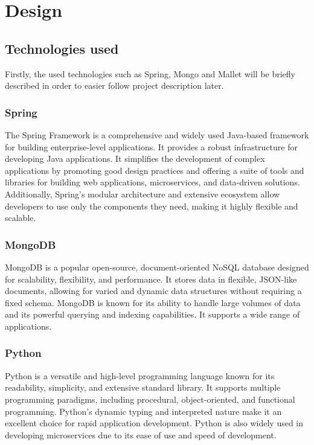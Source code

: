 \section{Design}

\label{ch:met}

\subsection{Technologies used}
Firstly, the used technologies such as Spring, Mongo and Mallet will be briefly described in order
to easier follow project description later.
\subsubsection{Spring}
The Spring Framework is a comprehensive and widely used Java-based framework for building
enterprise-level applications. It provides a robust infrastructure for developing Java applications.
It simplifies the development of complex applications by promoting good design practices and
offering a suite of tools and libraries for building web applications, microservices, and
data-driven solutions. Additionally, Spring's modular architecture and extensive ecosystem
allow developers to use only the components they need, making it highly flexible and scalable.
\cite{spring}

\subsubsection{MongoDB}
MongoDB is a popular open-source, document-oriented NoSQL database designed for scalability,
flexibility, and performance. It stores data in flexible, JSON-like documents, allowing for varied
and dynamic data structures without requiring a fixed schema. MongoDB is known for its ability to handle large
volumes of data and its powerful querying and indexing capabilities. It supports a wide range of applications.
\cite{mongodb}

\subsubsection{Python}
Python is a versatile and high-level programming language known for its readability, simplicity, and extensive
standard library. It supports multiple programming paradigms, including procedural, object-oriented, and
functional programming. Python's dynamic typing and interpreted nature make it an excellent choice for rapid
application development. Python is also widely used in developing microservices due to its ease of use and
speed of development. \cite{python}

